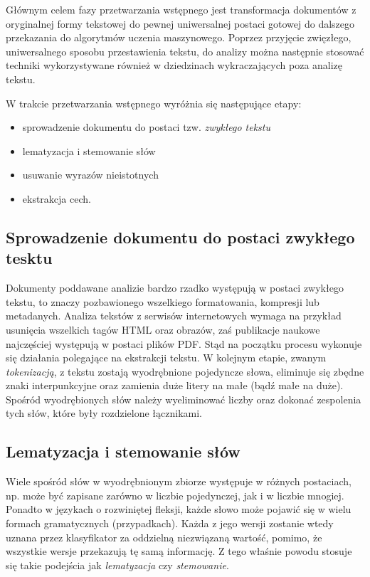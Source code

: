 \documentclass{pracamgr}
\begin{document}
Głównym celem fazy przetwarzania wstępnego jest transformacja dokumentów z oryginalnej formy tekstowej do pewnej uniwersalnej postaci gotowej do dalszego przekazania do algorytmów uczenia maszynowego. Poprzez przyjęcie zwięzłego, uniwersalnego sposobu przestawienia tekstu, do analizy można następnie stosować techniki wykorzystywane również w dziedzinach wykraczających poza analizę tekstu.

W trakcie przetwarzania wstępnego wyróżnia się następujące etapy:
\begin{itemize} %
    \item sprowadzenie dokumentu do postaci tzw. \textit{zwykłego tekstu}
    \item lematyzacja i stemowanie słów
    \item usuwanie wyrazów nieistotnych
    \item ekstrakcja cech.
\end{itemize}

\subsection{Sprowadzenie dokumentu do postaci zwykłego tesktu}

Dokumenty poddawane analizie bardzo rzadko występują w postaci zwykłego tekstu, to znaczy pozbawionego wszelkiego formatowania, kompresji lub metadanych. Analiza tekstów z serwisów internetowych wymaga na przykład usunięcia wszelkich tagów HTML oraz obrazów, zaś publikacje naukowe najczęściej występują w postaci plików PDF. Stąd na początku procesu wykonuje się działania polegające na ekstrakcji tekstu. W kolejnym etapie, zwanym \textit{tokenizacją}, z tekstu zostają wyodrębnione pojedyncze słowa, eliminuje się zbędne znaki interpunkcyjne oraz zamienia duże litery na małe (bądź małe na duże). Spośród wyodrębionych słów należy wyeliminować liczby oraz dokonać zespolenia tych słów, które były rozdzielone łącznikami.

\subsection{Lematyzacja i stemowanie słów}

Wiele spośród słów w wyodrębnionym zbiorze występuje w różnych postaciach, np. może być zapisane zarówno w liczbie pojedynczej, jak i w liczbie mnogiej. Ponadto w językach o rozwiniętej fleksji, każde słowo może pojawić się w wielu formach gramatycznych (przypadkach). Każda z jego wersji zostanie wtedy uznana przez klasyfikator za oddzielną niezwiązaną wartość, pomimo, że wszystkie wersje przekazują tę samą informację. Z tego właśnie powodu stosuje się takie podejścia jak \textit{lematyzacja} czy \textit{stemowanie}.
\end{document}
